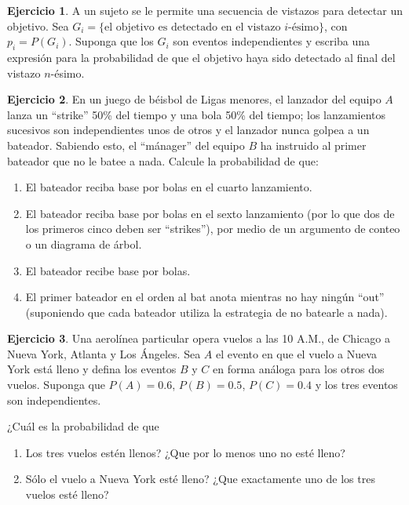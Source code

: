 \documentclass[
  11pt,
]{book}
\theoremstyle{definition}
\theoremstyle{definition}
\theoremstyle{definition}
\newtheorem{exercise}{Ejercicio}[chapter]
\theoremstyle{definition}
\theoremstyle{remark}
\begin{document}
\begin{exercise}
A un sujeto se le permite una secuencia de vistazos para detectar un objetivo. Sea \(G_i = \{ \text{el objetivo es detectado en el vistazo } i\text{-ésimo} \}\), con \(p_i = P(G_i)\). Suponga que los \(G_i\) son eventos independientes y escriba una expresión para la probabilidad de que el objetivo haya sido detectado al final del vistazo \(n\)-ésimo.
\end{exercise}

\begin{exercise}

En un juego de béisbol de Ligas menores, el lanzador del equipo \(A\) lanza un ``strike'' 50\% del tiempo y una bola 50\% del tiempo; los lanzamientos sucesivos son independientes unos de otros y el lanzador nunca golpea a un bateador. Sabiendo esto, el ``mánager'' del equipo \(B\) ha instruido al primer bateador que no le batee a nada. Calcule la probabilidad de que:

\begin{enumerate}
\def\labelenumi{\alph{enumi}.}
\item
  El bateador reciba base por bolas en el cuarto lanzamiento.
\item
  El bateador reciba base por bolas en el sexto lanzamiento (por lo que dos de los primeros cinco deben ser ``strikes''), por medio de un argumento de conteo o un diagrama de árbol.
\item
  El bateador recibe base por bolas.
\item
  El primer bateador en el orden al bat anota mientras no hay ningún ``out'' (suponiendo que cada bateador utiliza la estrategia de no batearle a nada).
\end{enumerate}

\end{exercise}

\begin{exercise}

Una aerolínea particular opera vuelos a las 10 A.M., de Chicago a Nueva York, Atlanta y Los Ángeles. Sea \(A\) el evento en que el vuelo a Nueva York está lleno y defina los eventos \(B\) y \(C\) en forma análoga para los otros dos vuelos. Suponga que \(P(A) = 0.6\), \(P(B) = 0.5\), \(P(C) = 0.4\) y los tres eventos son independientes.

¿Cuál es la probabilidad de que

\begin{enumerate}
\def\labelenumi{\alph{enumi}.}
\item
  Los tres vuelos estén llenos? ¿Que por lo menos uno no esté lleno?
\item
  Sólo el vuelo a Nueva York esté lleno? ¿Que exactamente uno de los tres vuelos esté lleno?\\
\end{enumerate}

\end{exercise}
\end{document}
